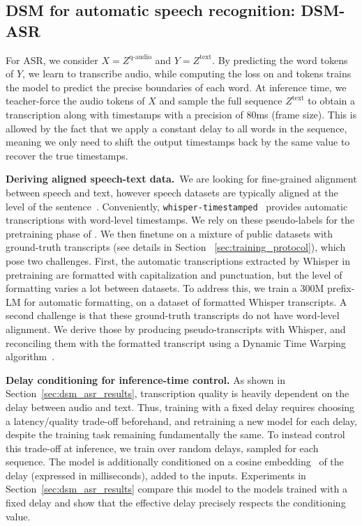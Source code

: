 \subsection{DSM for automatic speech recognition: DSM-ASR}
\label{sec:dsm_asr}

For ASR, we consider $X = Z^\text{q-audio}$  and $Y = Z^\text{text}$. By predicting the word tokens of $Y$, we learn to transcribe audio, while computing the loss on  and  tokens trains the model to predict the precise boundaries of each word. At inference time, we teacher-force the audio tokens of $X$ and sample the full sequence $Z^\text{text}$ to obtain a transcription along with timestamps with a precision of 80ms (frame size). %
This is allowed by the fact that we apply a constant delay to all words in the sequence, meaning we only need to shift the output timestamps back by the same value to recover the true timestamps. %

\textbf{Deriving aligned speech-text data.}\ 
We are looking for fine-grained alignment between speech and text, however speech datasets are typically aligned at the level of the sentence~\citep{librispeech}. Conveniently, \texttt{whisper-timestamped}~\citep{lintoai2023whispertimestamped} provides automatic transcriptions with word-level timestamps. We rely on these pseudo-labels for the pretraining phase of \oursASR{}. We then finetune on a mixture of public datasets with ground-truth transcripts (see details in Section ~\ref{sec:training_protocol}), which pose two challenges.
First, the automatic transcriptions extracted by Whisper in pretraining are formatted with capitalization and punctuation, but the level of formatting varies a lot between datasets.
To address this, we train a 300M prefix-LM for automatic formatting, on a dataset of formatted Whisper transcripts. %
A second challenge is that these ground-truth transcripts do not have word-level alignment. We derive those by producing pseudo-transcripts with Whisper, and reconciling them with the formatted transcript using a Dynamic Time Warping algorithm~\citep{giorgino2009computing}.

\textbf{Delay conditioning for inference-time control.}
As shown in Section~\ref{sec:dsm_asr_results},  transcription quality is heavily dependent on the delay between audio and text. Thus, training \oursASR{} with a fixed delay requires choosing a latency/quality trade-off beforehand, and retraining a new model for each delay, despite the training task remaining fundamentally the same. To instead control this trade-off at inference, we train \oursASR{} over random delays, sampled for each sequence. %
The model is additionally conditioned on a cosine embedding~\citep{attentionvaswani} of the delay (expressed in milliseconds), added to the inputs. Experiments in Section~\ref{sec:dsm_asr_results} compare this model to the models trained with a fixed delay %
and show that the effective delay precisely respects the conditioning value.

